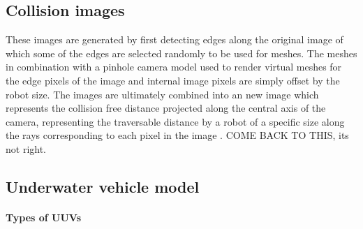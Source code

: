 \subsection{Collision images}
These images are generated by first detecting edges along the original image of which some of the edges are selected randomly to be used for meshes. The meshes in combination with a pinhole camera model used to render virtual meshes for the edge pixels of the image and internal image pixels are simply offset by the robot size. The images are ultimately combined into an new image which represents the collision free distance projected along the central axis of the camera, representing the traversable distance by a robot of a specific size along the rays corresponding to each pixel in the image \parencite{kulkarni2023task}. COME BACK TO THIS, its not right.

\subsection{Underwater vehicle model}
\paragraph{Types of UUVs}

